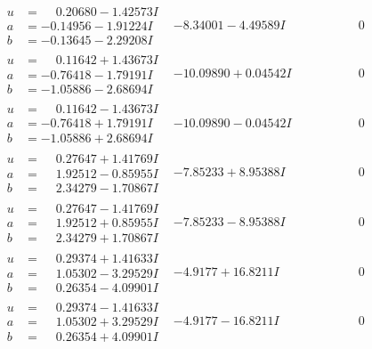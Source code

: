 \documentclass[1p]{elsarticle_modified}
\theoremstyle{definition}
\begin{document}
$$\begin{array}{c|c|c}
\begin{aligned}
u &= \phantom{-}0.20680 - 1.42573 I \\
a &= -0.14956 - 1.91224 I \\
b &= -0.13645 - 2.29208 I\end{aligned}
 & -8.34001 - 4.49589 I & \phantom{-0.000000 } 0 \\ \hline\begin{aligned}
u &= \phantom{-}0.11642 + 1.43673 I \\
a &= -0.76418 - 1.79191 I \\
b &= -1.05886 - 2.68694 I\end{aligned}
 & -10.09890 + 0.04542 I & \phantom{-0.000000 } 0 \\ \hline\begin{aligned}
u &= \phantom{-}0.11642 - 1.43673 I \\
a &= -0.76418 + 1.79191 I \\
b &= -1.05886 + 2.68694 I\end{aligned}
 & -10.09890 - 0.04542 I & \phantom{-0.000000 } 0 \\ \hline\begin{aligned}
u &= \phantom{-}0.27647 + 1.41769 I \\
a &= \phantom{-}1.92512 - 0.85955 I \\
b &= \phantom{-}2.34279 - 1.70867 I\end{aligned}
 & -7.85233 + 8.95388 I & \phantom{-0.000000 } 0 \\ \hline\begin{aligned}
u &= \phantom{-}0.27647 - 1.41769 I \\
a &= \phantom{-}1.92512 + 0.85955 I \\
b &= \phantom{-}2.34279 + 1.70867 I\end{aligned}
 & -7.85233 - 8.95388 I & \phantom{-0.000000 } 0 \\ \hline\begin{aligned}
u &= \phantom{-}0.29374 + 1.41633 I \\
a &= \phantom{-}1.05302 - 3.29529 I \\
b &= \phantom{-}0.26354 - 4.09901 I\end{aligned}
 & -4.9177 + 16.8211 I & \phantom{-0.000000 } 0 \\ \hline\begin{aligned}
u &= \phantom{-}0.29374 - 1.41633 I \\
a &= \phantom{-}1.05302 + 3.29529 I \\
b &= \phantom{-}0.26354 + 4.09901 I\end{aligned}
 & -4.9177 - 16.8211 I & \phantom{-0.000000 } 0 \\ \hline\begin{aligned}

\end{aligned}
\end{array}$$
\end{document}
